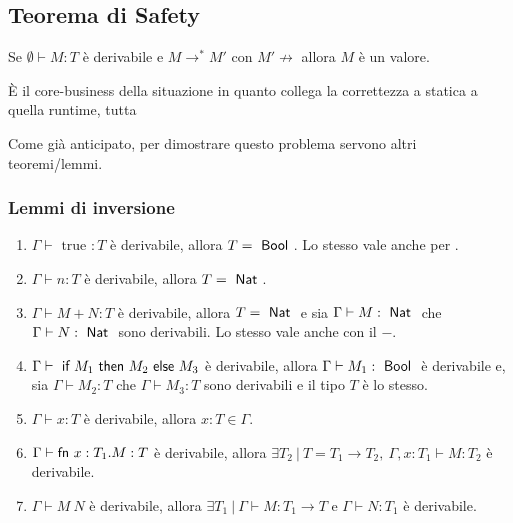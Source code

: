 


\subsection{Teorema di Safety}

\begin{center}
	Se $\emptyset \vdash M : T$ è derivabile e $M \rightarrow^* M'$ con $M' \not\rightarrow$ allora $M$ è un valore.
\end{center}

\`E il core-business della situazione in quanto collega la correttezza a statica a quella runtime, tutta

Come già anticipato, per dimostrare questo problema servono altri teoremi/lemmi.

\subsubsection{Lemmi di inversione}

\begin{enumerate}
	\item $\Gamma \vdash \text{ true } : T $ è derivabile, allora $T = \Bool $. Lo stesso vale anche per .
	\item $\Gamma \vdash n : T$ è derivabile, allora $T = \Nat$.
	\item $\Gamma \vdash M + N : T$ è derivabile, allora $T = \Nat$ e sia $\Gamma \vdash M : \Nat$ che $\Gamma \vdash N : \Nat$ sono derivabili. Lo stesso vale anche con il $-$.
	\item $\Gamma \vdash \iif M_1 \then M_2 \eelse M_3$ è derivabile, allora $\Gamma \vdash M_1 : \Bool$ è derivabile e, sia $\Gamma \vdash M_2 : T $ che $\Gamma \vdash M_3 :T $ sono derivabili e il tipo $T$ è lo stesso.
	\item $\Gamma \vdash x : T$ è derivabile, allora $x : T \in \Gamma$.
	\item $\Gamma \vdash \fn x : T_1 . M : T$ è derivabile, allora $\exists T_2 \: | \: T = T_1 \rightarrow T_2, \: \Gamma, x:T_1 \vdash M : T_2$ è derivabile.
	\item $\Gamma \vdash M \: N$ è derivabile, allora $ \exists T_1 \: | \: \Gamma \vdash M : T_1 \rightarrow T $ e $\Gamma \vdash N : T_1 $ è derivabile.
\end{enumerate}

